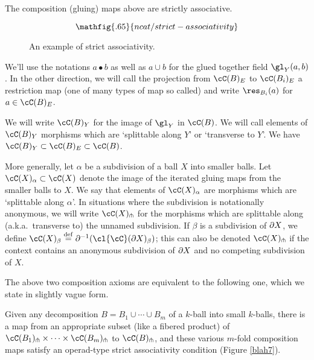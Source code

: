 \begin{axiom} \label{nca-assoc}
The composition (gluing) maps above are strictly associative.
\end{axiom}

\begin{figure}[!ht]
$$\mathfig{.65}{ncat/strict-associativity}$$
\caption{An example of strict associativity.}\label{blah6}\end{figure}

We'll use the notations  $a\bullet b$ as well as $a \cup b$ for the glued together field $\gl_Y(a, b)$.
In the other direction, we will call the projection from $\cC(B)_E$ to $\cC(B_i)_E$ 
a restriction map (one of many types of map so called) and write $\res_{B_i}(a)$ for $a\in \cC(B)_E$.

We will write $\cC(B)_Y$ for the image of $\gl_Y$ in $\cC(B)$.
We will call elements of $\cC(B)_Y$ morphisms which are `splittable along $Y$' or `transverse to $Y$'.
We have $\cC(B)_Y \sub \cC(B)_E \sub \cC(B)$.

More generally, let $\alpha$ be a subdivision of a ball $X$ into smaller balls.
Let $\cC(X)_\alpha \sub \cC(X)$ denote the image of the iterated gluing maps from 
the smaller balls to $X$.
We  say that elements of $\cC(X)_\alpha$ are morphisms which are `splittable along $\alpha$'.
In situations where the subdivision is notationally anonymous, we will write
$\cC(X)\spl$ for the morphisms which are splittable along (a.k.a.\ transverse to)
the unnamed subdivision.
If $\beta$ is a subdivision of $\partial X$, we define $\cC(X)_\beta \deq \bd\inv(\cl{\cC}(\bd X)_\beta)$;
this can also be denoted $\cC(X)\spl$ if the context contains an anonymous
subdivision of $\partial X$ and no competing subdivision of $X$.

The above two composition axioms are equivalent to the following one,
which we state in slightly vague form.

{Given any decomposition $B = B_1\cup\cdots\cup B_m$ of a $k$-ball
into small $k$-balls, there is a 
map from an appropriate subset (like a fibered product) 
of $\cC(B_1)\spl\times\cdots\times\cC(B_m)\spl$ to $\cC(B)\spl$,
and these various $m$-fold composition maps satisfy an
operad-type strict associativity condition (Figure \ref{blah7}).}

